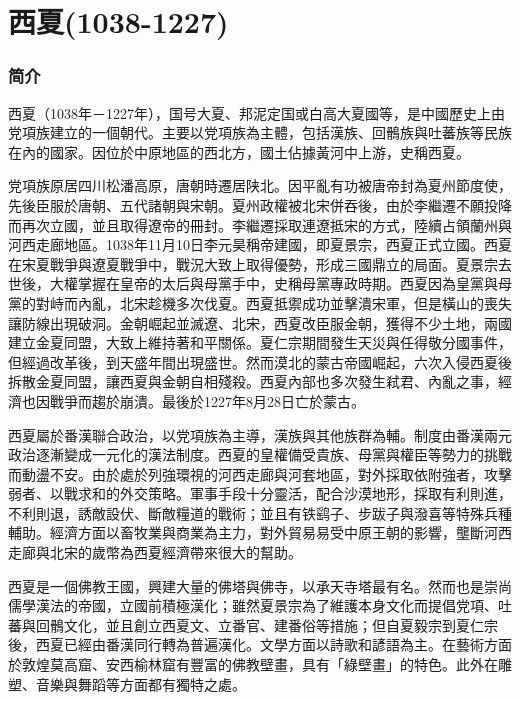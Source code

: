 
\chapter{西夏\tiny(1038-1227)}

\subsection{简介}

西夏（1038年－1227年），国号大夏、邦泥定国或白高大夏國等，是中國歷史上由党項族建立的一個朝代。主要以党項族為主體，包括漢族、回鶻族與吐蕃族等民族在內的國家。因位於中原地區的西北方，國土佔據黃河中上游，史稱西夏。

党項族原居四川松潘高原，唐朝時遷居陕北。因平亂有功被唐帝封為夏州節度使，先後臣服於唐朝、五代諸朝與宋朝。夏州政權被北宋併吞後，由於李繼遷不願投降而再次立國，並且取得遼帝的冊封。李繼遷採取連遼抵宋的方式，陸續占領蘭州與河西走廊地區。1038年11月10日李元昊稱帝建國，即夏景宗，西夏正式立國。西夏在宋夏戰爭與遼夏戰爭中，戰況大致上取得優勢，形成三國鼎立的局面。夏景宗去世後，大權掌握在皇帝的太后與母黨手中，史稱母黨專政時期。西夏因為皇黨與母黨的對峙而內亂，北宋趁機多次伐夏。西夏抵禦成功並擊潰宋軍，但是橫山的喪失讓防線出現破洞。金朝崛起並滅遼、北宋，西夏改臣服金朝，獲得不少土地，兩國建立金夏同盟，大致上維持著和平關係。夏仁宗期間發生天災與任得敬分國事件，但經過改革後，到天盛年間出現盛世。然而漠北的蒙古帝國崛起，六次入侵西夏後拆散金夏同盟，讓西夏與金朝自相殘殺。西夏內部也多次發生弒君、內亂之事，經濟也因戰爭而趨於崩潰。最後於1227年8月28日亡於蒙古。

西夏屬於番漢聯合政治，以党項族為主導，漢族與其他族群為輔。制度由番漢兩元政治逐漸變成一元化的漢法制度。西夏的皇權備受貴族、母黨與權臣等勢力的挑戰而動盪不安。由於處於列強環視的河西走廊與河套地區，對外採取依附強者，攻擊弱者、以戰求和的外交策略。軍事手段十分靈活，配合沙漠地形，採取有利則進，不利則退，誘敵設伏、斷敵糧道的戰術；並且有铁鹞子、步跋子與潑喜等特殊兵種輔助。經濟方面以畜牧業與商業為主力，對外貿易易受中原王朝的影響，壟斷河西走廊與北宋的歲幣為西夏經濟帶來很大的幫助。

西夏是一個佛教王國，興建大量的佛塔與佛寺，以承天寺塔最有名。然而也是崇尚儒學漢法的帝國，立國前積極漢化；雖然夏景宗為了維護本身文化而提倡党項、吐蕃與回鶻文化，並且創立西夏文、立番官、建番俗等措施；但自夏毅宗到夏仁宗後，西夏已經由番漢同行轉為普遍漢化。文學方面以詩歌和諺語為主。在藝術方面於敦煌莫高窟、安西榆林窟有豐富的佛教壁畫，具有「綠壁畫」的特色。此外在雕塑、音樂與舞蹈等方面都有獨特之處。

